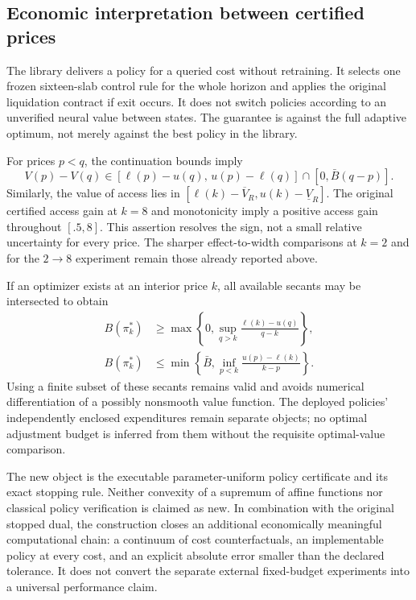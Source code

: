 \subsection{Economic interpretation between certified prices}
The library delivers a policy for a queried cost without retraining. It selects one frozen sixteen-slab control rule for the whole horizon and applies the original liquidation contract if exit occurs. It does not switch policies according to an unverified neural value between states. The guarantee is against the full adaptive optimum, not merely against the best policy in the library.

For prices $p<q$, the continuation bounds imply
\begin{equation}
 V(p)-V(q)\in[\ell(p)-u(q),\,u(p)-\ell(q)]\cap[0,\bar B(q-p)].
 \label{r12:effects}
\end{equation}
Similarly, the value of access lies in $[\ell(k)-\overline V_R,u(k)-\underline V_R]$. The original certified access gain at $k=8$ and monotonicity imply a positive access gain throughout $[.5,8]$. This assertion resolves the sign, not a small relative uncertainty for every price. The sharper effect-to-width comparisons at $k=2$ and for the $2\to8$ experiment remain those already reported above.

If an optimizer exists at an interior price $k$, all available secants may be intersected to obtain
\begin{align}
 B(\pi_k^*)&\geq\max\left\{0,\sup_{q>k}\frac{\ell(k)-u(q)}{q-k}\right\},\label{r12:budgetlower}\\
 B(\pi_k^*)&\leq\min\left\{\bar B,\inf_{p<k}\frac{u(p)-\ell(k)}{k-p}\right\}.
 \label{r12:budgetupper}
\end{align}
Using a finite subset of these secants remains valid and avoids numerical differentiation of a possibly nonsmooth value function. The deployed policies' independently enclosed expenditures remain separate objects; no optimal adjustment budget is inferred from them without the requisite optimal-value comparison.

The new object is the executable parameter-uniform policy certificate and its exact stopping rule. Neither convexity of a supremum of affine functions nor classical policy verification is claimed as new. In combination with the original stopped dual, the construction closes an additional economically meaningful computational chain: a continuum of cost counterfactuals, an implementable policy at every cost, and an explicit absolute error smaller than the declared tolerance. It does not convert the separate external fixed-budget experiments into a universal performance claim.
